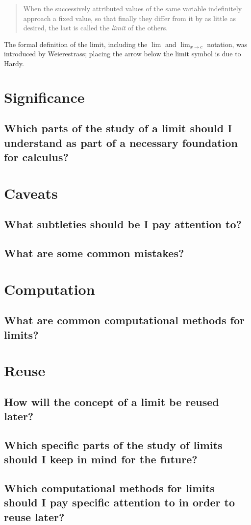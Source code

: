 \begin{quotation}
  When the successively attributed values of the same variable indefinitely approach a fixed value, so that finally they differ from it by as little as desired, the last is called the \textit{limit} of the others.
\end{quotation} %

The formal definition of the limit, including the $\lim$ and $\lim_{x\to c}$  notation, was introduced by Weierestrass; placing the arrow below the limit symbol is due to Hardy. %

\section{Significance}
\subsection{Which parts of the study of a limit should I understand as part of a necessary foundation for calculus?}

\section{Caveats}
\subsection{What subtleties should be I pay attention to?}
\subsection{What are some common mistakes?}

\section{Computation}
\subsection{What are common computational methods for limits?}

\section{Reuse}
\subsection{How will the concept of a limit be reused later?}
\subsection{Which specific parts of the study of limits should I keep in mind for the future?}
\subsection{Which computational methods for limits should I pay specific attention to in order to reuse later?}
